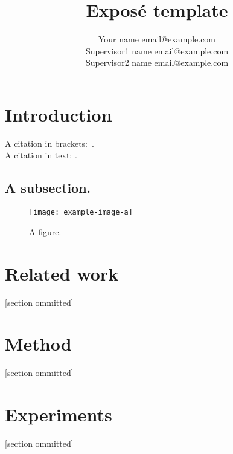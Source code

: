 \documentclass[akbc,twoside,11pt,lettersize]{article}
\begin{document}
\title{Exposé template}

\author{\name Your name \email email@example.com \\
\AND
\name Supervisor1 name \email email@example.com \\
\AND
\name Supervisor2 name  \email email@example.com}



\maketitle


\section{Introduction}
\label{Introduction}

    A citation in brackets:~\cite{lecun2015deep}. \\
    A citation in text: \citet{lecun2015deep}.
    
    \subsection{A subsection.}

    \begin{figure}[h]
        \centering
        \texttt{[image: example-image-a]}
    \caption{A figure.}
    \label{figure1}
    \end{figure}

\section{Related work}
\label{related_work}

    [section ommitted]

\section{Method}
\label{method}

    [section ommitted]

\section{Experiments}
\label{experiments}
 
    [section ommitted]



\end{document}

